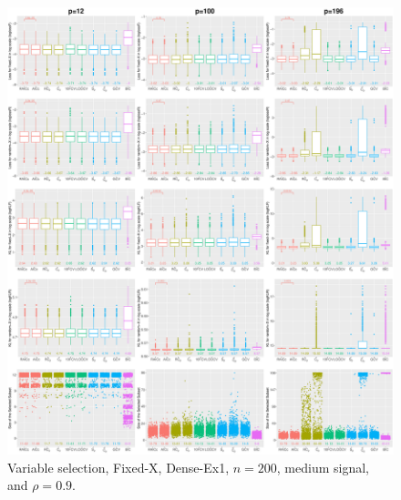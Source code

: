 \begin{figure}[!ht]
\centering
\includegraphics[width=\textwidth]{figures/supplement/fixedx/subset_selection/Dense-Ex1_n200_msnr_rho09.eps}
\caption{Variable selection, Fixed-X, Dense-Ex1, $n=200$, medium signal, and $\rho=0.9$.}
\end{figure}
\clearpage
